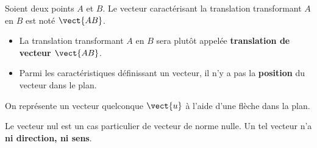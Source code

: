 \documentclass{article}
\begin{document}
\begin{definition}
Soient deux points $A$ et $B$. Le vecteur caractérisant la translation transformant $A$ en $B$ est noté $\vect{AB}$.
\end{definition}
\begin{remark}
\hfill
\begin{itemize}
\item La translation transformant $A$ en $B$ sera plutôt appelée \textbf{translation de vecteur $\vect{AB}$}.
\item Parmi les caractéristiques définissant un vecteur, il n'y a pas la \textbf{position} du vecteur dans le plan.
\end{itemize}
\end{remark}
\begin{example}
On représente un vecteur quelconque $\vect{u}$ à l'aide d'une flèche dans la plan.
\begin{center}
\end{center}
\end{example}
\begin{tcolorbox}
Le vecteur nul est un cas particulier de vecteur de norme nulle. Un tel vecteur n'a \textbf{ni direction, ni sens}.
\end{tcolorbox}
\end{document}
